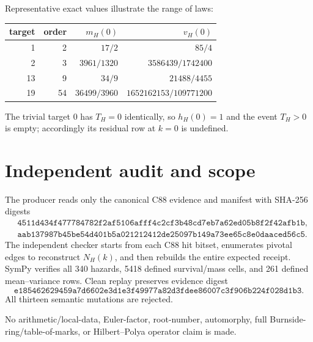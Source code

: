 \documentclass[10pt]{article}
\begin{document}
Representative exact values illustrate the range of laws:
\begin{center}
\begin{tabular}{rrrr}
\toprule
target & order & $m_H(0)$ & $v_H(0)$\\
\midrule
1 & 2 & $17/2$ & $85/4$\\
2 & 3 & $3961/1320$ & $3586439/1742400$\\
13 & 9 & $34/9$ & $21488/4455$\\
19 & 54 & $36499/3960$ & $1652162153/109771200$\\
\bottomrule
\end{tabular}
\end{center}
The trivial target 0 has $T_H=0$ identically, so $h_H(0)=1$ and the event
$T_H>0$ is empty; accordingly its residual row at $k=0$ is undefined.

\section{Independent audit and scope}
The producer reads only the canonical C88 evidence and manifest with SHA-256
digests
\begin{align*}
&\texttt{4511d434f477784782f2af5106afff4c2cf3b48cd7eb7a62ed05b8f2f42afb1b},\\
&\texttt{aab137987b45be54d401b5a021212412de25097b149a73ee65c8e0daaced56c5}.
\end{align*}
The independent checker starts from each C88 hit bitset, enumerates pivotal
edges to reconstruct $N_H(k)$, and then rebuilds the entire expected receipt.
SymPy verifies all 340 hazards, 5418 defined survival/mass cells, and 261
defined mean--variance rows.  Clean replay preserves evidence digest
\[
\texttt{e185462629459a7d6602e3d1e3f49977a82d3fdee86007c3f906b224f028d1b3}.
\]
All thirteen semantic mutations are rejected.

No arithmetic/local-data, Euler-factor, root-number, automorphy, full
Burnside-ring/table-of-marks, or Hilbert--Polya operator claim is made.
\end{document}
